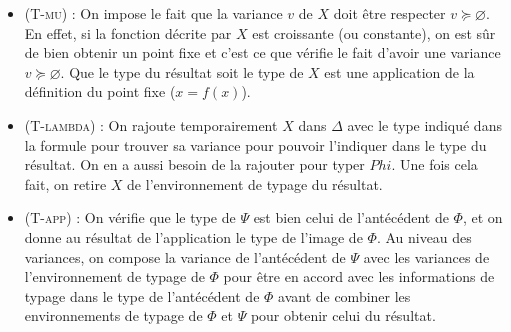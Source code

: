 \documentclass{rapport}
\theoremstyle{plain}
\theoremstyle{remark}
\theoremstyle{definition}
\begin{document}
\begin{itemize}
	\item (\textsc{T-mu}) : On impose le fait que la variance $v$ de $X$ doit être respecter $v \succcurlyeq \varnothing$. En effet, si la fonction décrite par $X$ est croissante (ou constante), on est sûr de bien obtenir un point fixe et c'est ce que vérifie le fait d'avoir une variance $v \succcurlyeq \varnothing$. Que le type du résultat soit le type de $X$ est une application de la définition du point fixe ($x = f(x)$).
	\item (\textsc{T-lambda}) : On rajoute temporairement $X$ dans $\Delta$ avec  le type indiqué dans la formule pour trouver sa variance pour pouvoir l'indiquer dans le type du résultat. On en a aussi besoin de la rajouter pour typer $Phi$. Une fois cela fait, on retire $X$ de l'environnement de typage du résultat. 
	\item (\textsc{T-app}) : On vérifie que le type de $\Psi$ est bien celui de l'antécédent de $\Phi$, et on donne au résultat de l'application le type de l'image de $\Phi$. Au niveau des variances, on compose la variance de l'antécédent de $\Psi$ avec les variances de l'environnement de typage de $\Phi$ pour être en accord avec les informations de typage dans le type de l'antécédent de $\Phi$ avant de combiner les environnements de typage de $\Phi$ et $\Psi$ pour obtenir celui du résultat. 
\end{itemize}
\end{document}
